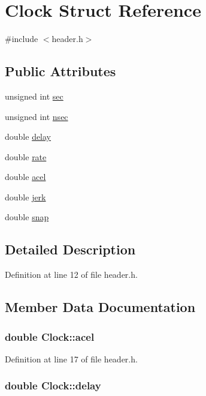 \hypertarget{structClock}{
\section{Clock Struct Reference}
\label{structClock}
}


{\ttfamily \#include $<$header.h$>$}\subsection*{Public Attributes}
\begin{DoxyCompactItemize}
\item 
unsigned int \hyperlink{structClock_ac40897245ac2e0546a181ed323d38a4c}{sec}
\item 
unsigned int \hyperlink{structClock_a2aed19e0769b7521a72694474cb8390e}{nsec}
\item 
double \hyperlink{structClock_a680555a5a5d23b9ac95f812c83336d8a}{delay}
\item 
double \hyperlink{structClock_a8c7791c437d3f43f5056a729b3196262}{rate}
\item 
double \hyperlink{structClock_a253d2a8cc27a0db036ce46acdf460395}{acel}
\item 
double \hyperlink{structClock_a3dbd6eae1fa92ba1dab38409269ef5e2}{jerk}
\item 
double \hyperlink{structClock_a83923321f6c622631e67f1df5a6e20c8}{snap}
\end{DoxyCompactItemize}


\subsection{Detailed Description}


Definition at line 12 of file header.h.

\subsection{Member Data Documentation}
\hypertarget{structClock_a253d2a8cc27a0db036ce46acdf460395}{
\subsubsection[{acel}]{\setlength{\rightskip}{0pt plus 5cm}double {\bf Clock::acel}}}
\label{structClock_a253d2a8cc27a0db036ce46acdf460395}


Definition at line 17 of file header.h.\hypertarget{structClock_a680555a5a5d23b9ac95f812c83336d8a}{
\subsubsection[{delay}]{\setlength{\rightskip}{0pt plus 5cm}double {\bf Clock::delay}}}
\label{structClock_a680555a5a5d23b9ac95f812c83336d8a}


